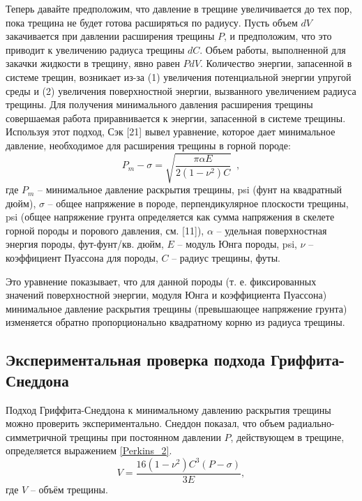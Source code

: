 \documentclass[a4paper, 12pt]{article}
\newcommand{\beq}{\begin{equation}}
\newcommand{\eeq}{\end{equation}}
\begin{document}
Теперь давайте предположим, что давление в трещине увеличивается до тех пор, пока трещина не будет готова расширяться по радиусу.
Пусть объем $dV$ закачивается при давлении расширения трещины $P$, и предположим, что это приводит к увеличению радиуса трещины $dC$.
Объем работы, выполненной для закачки жидкости в трещину, явно равен $PdV$.
Количество энергии, запасенной в системе трещин, возникает из-за (1) увеличения потенциальной энергии упругой среды и (2) увеличения поверхностной энергии, вызванного увеличением радиуса трещины.
Для получения минимального давления расширения трещины совершаемая работа приравнивается к энергии, запасенной в системе трещины.
Используя этот подход, Сэк [21] вывел уравнение, которое дает минимальное давление, необходимое для расширения трещины в горной породе:
\beq\label{Perkins_1}
P_m-\sigma=\sqrt{\frac{\pi\alpha E}{2\left(1-\nu^2\right)C}}\,\,\,,
\tag{1}
\eeq
где $P_m$ -- минимальное давление раскрытия трещины, psi (фунт на квадратный дюйм),\newline
$\sigma$ -- общее напряжение в породе, перпендикулярное плоскости трещины, psi (общее напряжение грунта определяется как сумма напряжения в скелете горной породы и порового давления, см. [11]),\newline
$\alpha$ -- удельная поверхностная энергия породы, фут-фунт/кв. дюйм,\newline
$E$ -- модуль Юнга породы, psi,\newline
$\nu$ -- коэффициент Пуассона для породы,\newline
$C$ -- радиус трещины, футы.

Это уравнение показывает, что для данной породы (т. е. фиксированных значений поверхностной энергии, модуля Юнга и коэффициента Пуассона) минимальное давление раскрытия трещины (превышающее напряжение грунта) изменяется обратно пропорционально квадратному корню из радиуса трещины.


\subsection{Экспериментальная проверка подхода Гриффита-Снеддона}

Подход Гриффита-Снеддона к минимальному давлению раскрытия трещины можно проверить экспериментально.
Снеддон показал, что объем радиально-симметричной трещины при постоянном давлении $P$, действующем в трещине, определяется выражением \eqref{Perkins_2}.
\beq\label{Perkins_2}
V=\frac{16\left(1-\nu^2\right)C^3\left(P-\sigma\right)}{3E},
\tag{2}
\eeq
где $V$ -- объём трещины.
\end{document}
